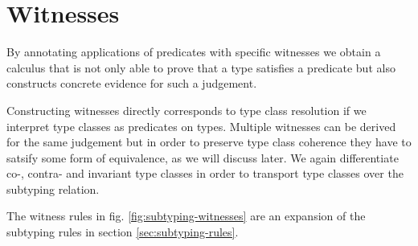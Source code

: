 \section{Witnesses}
\label{sec:witnesses}

By annotating applications of predicates with specific witnesses we obtain a calculus
that is not only able to prove that a type satisfies a predicate but also constructs concrete evidence for such a judgement.

Constructing witnesses directly corresponds to type class resolution if we interpret type classes as predicates on types.
Multiple witnesses can be derived for the same judgement but in order to preserve type class coherence they have to satsify some form of equivalence, as we will discuss later.
We again differentiate co-, contra-  and invariant type classes in order to transport type classes over the subtyping relation.

The witness rules in fig. \ref{fig:subtyping-witnesses} are an expansion of the subtyping rules in section \ref{sec:subtyping-rules}.


